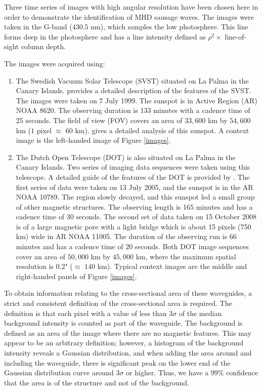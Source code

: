 	Three time series of images with high angular resolution have been chosen here in order to demonstrate the identification of MHD sausage waves.
	The images were taken in the G-band ($430.5$ nm), which samples the low photosphere.
	This line forms deep in the photosphere and has a line intensity defined as $\rho{^2} \times$ line-of-sight column depth.
	
	The images were acquired using:

	\begin{enumerate}
		\item 
			The Swedish Vacuum Solar Telescope (SVST) situated on La Palma in the Canary Islands.
			\citet{scharmer} provides a detailed description of the features of the SVST.
			The images were taken on 7 July 1999.
			The sunspot is in Active Region (AR) NOAA 8620.
			The observing duration is 133 minutes with a cadence time of 25 seconds.
			The field of view (FOV) covers an area of $33,600$ km by $54,600$ km ($1$ pixel $\approx$ $60$ km). \citet{bonet} gives a detailed analysis of this sunspot.
			A context image is the left-handed image of Figure \ref{images}.
		\item 
			The Dutch Open Telescope (DOT) is also situated on La Palma in the Canary Islands.
			Two series of imaging data sequences were taken using this telescope.
			A detailed guide of the features of the DOT is  provided by \citet{rutten}.
			The first series of data were taken on 13 July 2005, and the sunspot is in the AR NOAA 10789.
			The region slowly decayed, and this sunspot led a small group of other magnetic structures.
			The observing length is 165 minutes and has a cadence time of $30$ seconds.
			The second set of data taken on 15 October 2008 is of a large magnetic pore with a light bridge which is about 15 pixels (750 km) wide in AR NOAA 11005.
			The duration of the observing run is 66 minutes and has a cadence time of $20$ seconds.
			Both DOT image sequences cover an area of $50,000$ km by $45,000$ km, where the maximum spatial resolution is 0.2" ($\approx$ $140$ km).
			Typical context images are the middle and right-handed panels of Figure \ref{images}.
   \end{enumerate}
   
	To obtain information relating to the cross-sectional area of these waveguides, a strict and consistent definition of the cross-sectional area is required.
	The definition is that each pixel with a value of less than $3\sigma$ of the median background intensity is counted as part of the waveguide.
	The background is defined as an area of the image where there are no magnetic features.
	This may appear to be an arbitrary definition; however, a histogram of the background intensity reveals a Gaussian distribution, and when adding the area around and including the waveguide, there is significant peak on the lower end of the Gaussian distribution curve around 3$\sigma$ or higher.
	Thus, we have a $99\%$ confidence that the area is of the structure and not of the background.
	
